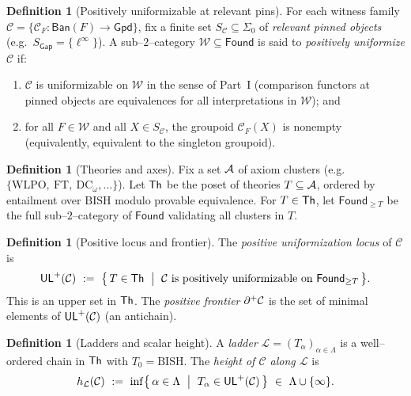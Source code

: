 \documentclass[11pt]{article}
\theoremstyle{definition}
\newtheorem{definition}[theorem]{Definition}
\theoremstyle{remark}
\newcommand{\linf}{\ell^\infty}
\newcommand{\WLPO}{\mathrm{WLPO}}
\newcommand{\BISH}{\mathrm{BISH}}
\newcommand{\Found}{\mathsf{Found}}
\newcommand{\Ban}{\mathsf{Ban}}
\newcommand{\Gpd}{\mathsf{Gpd}}
\newcommand{\SigmaZero}{\Sigma_{0}}
\begin{document}
\begin{definition}[Positively uniformizable at relevant pins]\label{p2:def:pos-unif}
For each witness family \(\mathcal C=\{\mathcal C_F:\Ban(F)\to\Gpd\}\), fix a finite set
\(S_{\mathcal C}\subseteq\SigmaZero\) of \emph{relevant pinned objects}
(e.g.\ \(S_{\mathsf{Gap}}=\{\linf\}\)).
A sub--$2$--category \(\mathcal W\subseteq\Found\) is said to \emph{positively uniformize} \(\mathcal C\) if:
\begin{enumerate}
\item \(\mathcal C\) is uniformizable on \(\mathcal W\) in the sense of Part~I (comparison functors at pinned objects are equivalences for all interpretations in \(\mathcal W\)); and
\item for all \(F\in\mathcal W\) and all \(X\in S_{\mathcal C}\), the groupoid \(\mathcal C_F(X)\) is nonempty (equivalently, equivalent to the singleton groupoid).
\end{enumerate}
\end{definition}

\begin{definition}[Theories and axes]\label{p2:def:theories-axes}
Fix a set \(\mathcal{A}\) of axiom clusters (e.g.\ \(\{\WLPO,\ \mathrm{FT},\ \mathrm{DC}_\omega,\ldots\}\)).
Let \(\mathsf{Th}\) be the poset of theories \(T\subseteq\mathcal{A}\), ordered by entailment over \(\BISH\) modulo provable equivalence. For \(T\in\mathsf{Th}\), let \(\Found_{\ge T}\) be the full sub--$2$--category of \(\Found\) validating all clusters in \(T\).
\end{definition}

\begin{definition}[Positive locus and frontier]\label{p2:def:ULpos-frontier}
The \emph{positive uniformization locus} of \(\mathcal C\) is
\[
  \ULpos(\mathcal C)\ :=\ \bigl\{\,T\in\Th\ \bigm|\ \mathcal C
  \text{ is positively uniformizable on }\Found_{\ge T}\,\bigr\}.
\]
This is an upper set in \(\mathsf{Th}\). The \emph{positive frontier} \(\partial^{+}\mathcal C\) is the set of minimal elements of \(\mathsf{UL}^{+}(\mathcal C)\) (an antichain).
\end{definition}

\begin{definition}[Ladders and scalar height]\label{p2:def:ladder-height}
A \emph{ladder} \(\mathcal L=(T_\alpha)_{\alpha\in\Lambda}\) is a well--ordered chain in \(\mathsf{Th}\) with \(T_0=\BISH\). The \emph{height of \(\mathcal C\) along \(\mathcal L\)} is
\[
  h_{\mathcal L}(\mathcal C)\ :=\ \inf\bigl\{\,\alpha\in\Lambda\ \bigm|\ T_\alpha\in\ULpos(\mathcal C)\,\bigr\}\ \in\ \Lambda\cup\{\infty\}.
\]
\end{definition}
\end{document}
